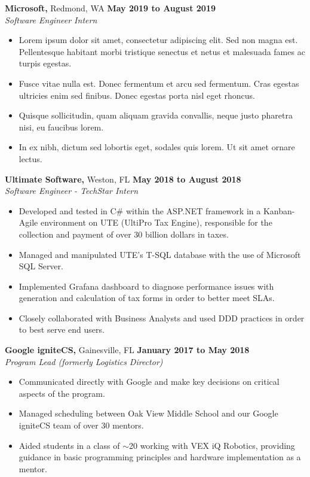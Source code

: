 \documentclass[11pt]{article} %
\begin{document}
		\noindent \textbf{Microsoft,} Redmond, WA \hfill\textbf{May 2019 to August 2019}\\
		\textit{Software Engineer Intern}
		\begin{itemize}[noitemsep,nolistsep, label = {-}]
			\item Lorem ipsum dolor sit amet, consectetur adipiscing elit. Sed non magna est. Pellentesque habitant morbi tristique senectus et netus et malesuada fames ac turpis egestas.
			\item Fusce vitae nulla est. Donec fermentum et arcu sed fermentum. Cras egestas ultricies enim sed finibus. Donec egestas porta nisl eget rhoncus. 
			\item Quisque sollicitudin, quam aliquam gravida convallis, neque justo pharetra nisi, eu faucibus lorem.
			\item In ex nibh, dictum sed lobortis eget, sodales quis lorem. Ut sit amet ornare lectus.
		\end{itemize}
	
		\vspace{.1cm}
		
		\noindent \textbf{Ultimate Software,} Weston, FL \hfill\textbf{May 2018 to August 2018}\\
		\textit{Software Engineer - TechStar Intern}
		\begin{itemize}[noitemsep,nolistsep, label = {-}]
			\item Developed and tested in C\# within the ASP.NET framework in a Kanban-Agile environment on UTE (UltiPro Tax Engine), responsible for the collection and payment of over 30 billion dollars in taxes.
			\item Managed and manipulated UTE's T-SQL database with the use of Microsoft SQL Server.
			\item Implemented Grafana dashboard to diagnose performance issues with generation and calculation of tax forms in order to better meet SLAs.
			\item Closely collaborated with Business Analysts and used DDD practices in order to best serve end users.
		\end{itemize}
		\vspace{.1cm}
		
		\noindent \textbf{Google igniteCS,} Gainesville, FL \hfill\textbf{January 2017 to May 2018}\\
		\textit{Program Lead (formerly Logistics Director)}
		\begin{itemize}[noitemsep,nolistsep, label = {-}]
			\item Communicated directly with Google and make key decisions on critical aspects of the program.
			\item Managed scheduling between Oak View Middle School and our Google igniteCS team of over 30 mentors.
			\item Aided students in a class of $\sim$20 working with VEX iQ Robotics, providing guidance in basic programming principles and hardware implementation as a mentor.
		\end{itemize} 
		\vspace{.1cm}
		
\end{document}

